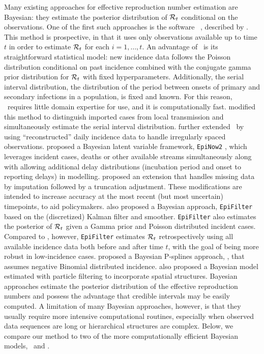 Many existing approaches for effective reproduction number estimation are
Bayesian: they estimate the posterior distribution of $\mathcal{R}_t$ conditional on
the observations. One of the first such approaches is the software \EpiEstim\
\citep{cori2020package}, described by \citet{cori2013new}. This method is
prospective, in that it uses only observations available up to time $t$ in order to
estimate $\mathcal{R}_t$ for each $i = 1,\ldots, t$. An advantage of \EpiEstim\ is its
straightforward statistical model: new incidence data follows the Poisson
distribution conditional on past incidence combined with the conjugate gamma prior
distribution for $\mathcal{R}_t$ with fixed hyperparameters. Additionally, the serial
interval distribution, the distribution of the period between onsets of primary and secondary 
infections in a population, is fixed and known. For this reason, \EpiEstim\ requires
little domain expertise for use, and it is computationally fast.
\citet{thompson2019improved} modified this method to distinguish imported cases from local transmission and
simultaneously estimate the serial interval distribution.
\citet{nash2023estimating} further extended \EpiEstim\ by using
``reconstructed'' daily incidence data to handle irregularly spaced observations.
% 
\cite{abbott2020estimating} proposed a Bayesian latent variable framework,
\texttt{EpiNow2} \citep{EpiNow2}, which leverages incident cases, deaths or
other available streams simultaneously along with allowing additional delay
distributions (incubation period and onset to reporting delays) in modelling.  
\citet{lison2023generative} proposed an extension that handles missing data by
imputation followed by a truncation adjustment. These modifications are intended
to increase accuracy at the most recent (but most uncertain) timepoints, to aid policymakers.
%
\citet{parag2021improved} also proposed a Bayesian approach, \texttt{EpiFilter}
based on the (discretized) Kalman filter and smoother. \texttt{EpiFilter} also
estimates the posterior of $\mathcal{R}_t$ given a Gamma prior and Poisson distributed
incident cases. Compared to \EpiEstim, however, \texttt{EpiFilter} estimates
$\mathcal{R}_t$ retrospectively using all available incidence data both before and
after time $t$, with the goal of being more robust in low-incidence cases.  
\citet{gressani2022epilps} proposed a Bayesian P-splines approach, \EpiLPS, that
assumes negative Binomial distributed incidence. \citet{trevisin2023spatially}
also proposed a Bayesian model estimated with particle filtering to incorporate
spatial structures.
%
Bayesian approaches estimate the posterior distribution of the effective
reproduction numbers and possess the advantage that credible intervals may be
easily computed. A limitation of many Bayesian approaches, however, is that they
usually require more intensive computational routines, especially when observed
data sequences are long or hierarchical structures are complex.  Below, we
compare our method to two of the more computationally efficient Bayesian models,
\EpiEstim\ and \EpiLPS. 

